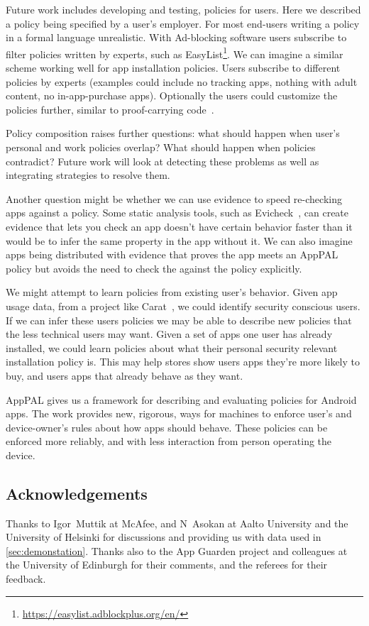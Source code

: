 \documentclass[]{llncs}
\begin{document}
Future work includes developing and testing, policies for users.
Here we described a policy being specified by a user's employer.
For most end-users writing a policy in a formal language unrealistic.
With Ad-blocking software users subscribe to filter policies written by experts, such as EasyList\footnote{\url{https://easylist.adblockplus.org/en/}}.
We can imagine a similar scheme working well for app installation policies.
Users subscribe to different policies by experts (examples could include no tracking apps, nothing with adult content, no in-app-purchase apps).
Optionally the users could customize the policies further, similar to proof-carrying code~\cite{Necula:1996tr}.

Policy composition raises further questions: what should happen when user's personal and work policies overlap?  
What should happen when policies contradict? 
Future work will look at detecting these problems as well as integrating strategies to resolve them.

Another question might be whether we can use evidence to speed re-checking apps against a policy.
Some static analysis tools, such as Evicheck~\cite{Seghir:2015er}, can create evidence that lets you check an app doesn't have certain behavior faster than it would be to infer the same property in the app without it.
We can also imagine apps being distributed with evidence that proves the app meets an AppPAL policy but avoids the need to check the against the policy explicitly.


We might attempt to learn policies from existing user's behavior.
Given app usage data, from a project like Carat~\cite{Oliner:2013ht}, we could identify security conscious users.
If we can infer these users policies we may be able to describe new policies that the less technical users may want.
Given a set of apps one user has already installed, we could learn policies about what their personal security relevant installation policy is.
This may help stores show users apps they're more likely to buy, and users apps that already behave as they want.

AppPAL gives us a framework for describing and evaluating policies for Android apps.
The work provides new, rigorous, ways for machines to enforce user's and device-owner's rules about how apps should behave.
These policies can be enforced more reliably, and with less interaction from person operating the device.

\subsection*{Acknowledgements}

Thanks to Igor~Muttik at McAfee, and N~Asokan at Aalto University and the University of Helsinki for discussions and providing us with data used in \autoref{sec:demonstation}.
Thanks also to the App Guarden project and colleagues at the University of Edinburgh for their comments, and the referees for their feedback.



\end{document}

